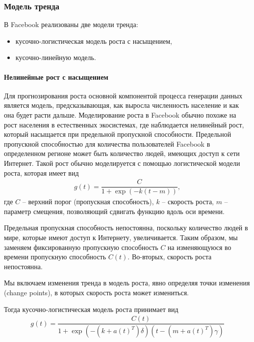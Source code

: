 \documentclass[%
	11pt,
	a4paper,
	utf8,
		]{article}
\begin{document}
\subsubsection{Модель тренда}

В Facebook реализованы две модели тренда:
\begin{itemize}
	\item кусочно-логистическая модель роста с насыщением,
	
	\item кусочно-линейную модель.
\end{itemize}

\paragraph{Нелинейные рост с насыщением}

Для прогнозирования роста основной компонентой процесса генерации данных является модель, предсказывающая, как выросла численность население и как она будет расти дальше. Моделирование роста в Facebook обычно похоже на рост населения в естественных экосистемах, где наблюдается нелинейный рост, который насыщается при предельной пропускной способности. Предельной пропускной способностью для количества пользователей Facebook в определенном регионе может быть количество людей, имеющих доступ к сети Интернет. Такой рост обычно моделируется с помощью логистической модели роста, которая имеет вид
\begin{align*}
	g(t) = \dfrac{C}{1 + \exp{(-k (t - m))}},
\end{align*}
где $C$ -- верхний порог (пропускная способность), $k$ -- скорость роста, $m$ -- параметр смещения, позволяющий сдвигать функцию вдоль оси времени.

Предельная пропускная способность непостоянна, поскольку количество людей в мире, которые имеют доступ к Интернету, увеличивается. Таким образом, мы заменяем фиксированную пропускную способность $ C $ на изменяющуюся во времени пропускную способность $C(t)$. Во-вторых, скорость роста непостоянна.

Мы включаем изменения тренда в модель роста, явно определяя точки изменения (change points), в которых скорость роста может измениться.

Тогда кусочно-логистическая модель роста принимает вид \cite[]{gruzdev:time-series-2022}
\begin{align*}
	g(t) = \dfrac{C(t)}{1 + \exp{(-(k + a(t)^T)\delta)} (t - (m + a(t)^T)\gamma) }
\end{align*}
\end{document}
